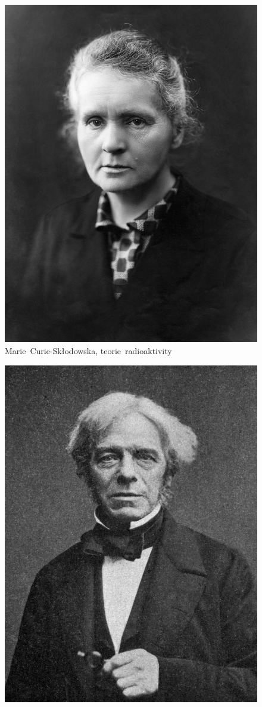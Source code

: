 \documentclass{../../../../style/mkimain}
\begin{document}
\begin{figure}[H]
  \begin{center}
    \includegraphics[width=0.8\linewidth]{images/marie-curie-sklodowska.jpg}
        Marie~Curie-Skłodowska, teorie~radioaktivity
      \end{center}
  \endminipage\hfill
  \begin{center}
    \includegraphics[width=0.8\linewidth]{images/michael-faraday.jpeg}

\end{center}
\end{figure}
\end{document}
